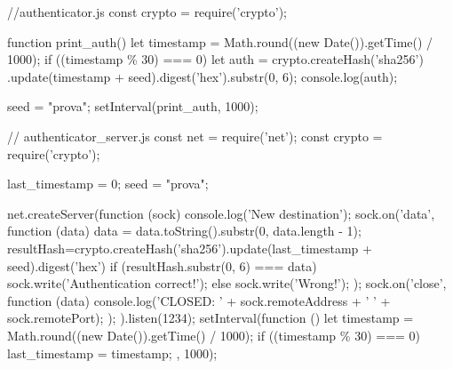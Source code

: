 \begin{Answer}[ref={authenticator}]
  
  \begin{js}
    //authenticator.js
    const crypto = require('crypto');
    
    function print_auth() {
      let timestamp = Math.round((new Date()).getTime() / 1000);
      if ((timestamp \% 30) === 0) {
      let auth = crypto.createHash('sha256')
      .update(timestamp + seed).digest('hex').substr(0, 6);
        console.log(auth);
      }
    }
    
    seed = "prova";
    setInterval(print_auth, 1000);
  \end{js}
  
  
  \begin{js}
    // authenticator\_server.js
    const net = require('net');
    const crypto = require('crypto');
    
    last_timestamp = 0;
    seed = "prova";
    
    net.createServer(function (sock) {
      console.log('New destination');
      sock.on('data', function (data) {
        data = data.toString().substr(0, data.length - 1);
        resultHash=crypto.createHash('sha256').update(last_timestamp + seed).digest('hex')
        if (resultHash.substr(0, 6) === data) {
          sock.write('Authentication correct!\n');
        }
        else {
          sock.write('Wrong!\n');
        }
      });
      sock.on('close', function (data) {
        console.log('CLOSED: ' + sock.remoteAddress + ' ' + sock.remotePort);
      });
    }).listen(1234);
    setInterval(function () {
      let timestamp = Math.round((new Date()).getTime() / 1000);
      if ((timestamp \% 30) === 0) {
        last_timestamp = timestamp;
      }
    }, 1000);
  \end{js}
\end{Answer}
